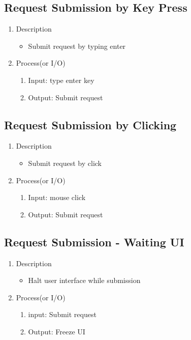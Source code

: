 \documentclass[conference]{IEEEtran}
\begin{document}
\subsection{Request Submission by Key Press}
\begin{enumerate}
\item Description
\begin{itemize}
  \item Submit request by typing enter 
\end{itemize}
\item Process(or I/O)
  \begin{enumerate}
  \item Input: type enter key
  \item Output: Submit request
  \end{enumerate}
\end{enumerate}
\textit{}

\subsection{Request Submission by Clicking}
\begin{enumerate}
\item Description
\begin{itemize}
  \item Submit request by click 
\end{itemize}
\item Process(or I/O)
  \begin{enumerate}
     \item Input: mouse click
    \item Output: Submit request
  \end{enumerate}
\end{enumerate}
\textit{}

\subsection{Request Submission - Waiting UI}
\begin{enumerate}
\item Description
\begin{itemize}
  \item Halt user interface while submission 
\end{itemize}
\item Process(or I/O)
  \begin{enumerate}
     \item input: Submit request 
     \item Output: Freeze UI
  \end{enumerate}
\end{enumerate}
\textit{}
\end{document}
